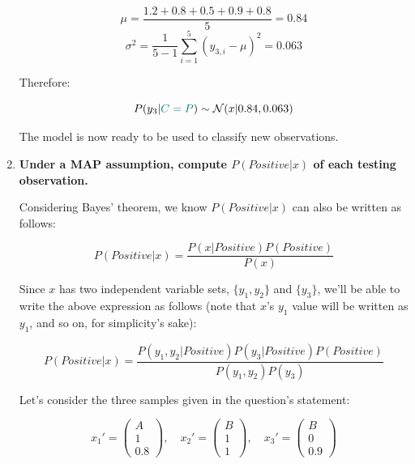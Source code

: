 \documentclass[12pt]{article}
\begin{document}
\begin{enumerate}[leftmargin=\labelsep]
\begin{multicols}{2}
          $$
            \mu = \frac{1.2 + 0.8 + 0.5 + 0.9 + 0.8}{5} = 0.84
          $$
          $$
            \sigma^2 = \frac{1}{5 - 1} \sum_{i = 1}^5 (y_{3, i} - \mu)^2 = 0.063
          $$

          Therefore:

          \vspace{-0.6cm}

          $$
            P(y_3 | \textcolor{teal}{C = P}) \sim \mathcal{N}(x | 0.84, 0.063)
          $$

        \end{multicols}

        The model is now ready to be used to classify new observations.

        \pagebreak

  \item \textbf{Under a MAP assumption, compute $P(Positive | x)$ of each testing observation.}

        Considering Bayes' theorem, we know $P(Positive | x)$ can also be written as follows:

        $$
          P(Positive | x) = \frac{P(x| Positive) P(Positive)}{P(x)}
        $$

        Since $x$ has two independent variable sets, $\{y_1, y_2\}$ and $\{y_3\}$, we'll be
        able to write the above expression as follows (note that $x$'s $y_1$ value will
        be written as $y_1$, and so on, for simplicity's sake):

        $$
          P(Positive | x) = \frac{P(y_1, y_2| Positive) P(y_3| Positive) P(Positive)}{P(y_1, y_2) P(y_3)}
        $$

        Let's consider the three samples given in the question's statement:

        $$
          x_1' = \begin{pmatrix}
            A \\
            1 \\
            0.8
          \end{pmatrix}, \quad
          x_2' = \begin{pmatrix}
            B \\
            1 \\
            1
          \end{pmatrix}, \quad
          x_3' = \begin{pmatrix}
            B \\
            0 \\
            0.9
          \end{pmatrix}
        $$


\end{enumerate}
\end{document}
